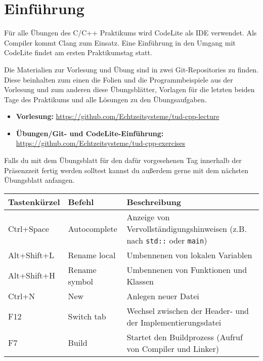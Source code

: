 \section*{Einführung}
Für alle Übungen des C/C++ Praktikums wird CodeLite als IDE verwendet. Als Compiler kommt Clang zum Einsatz.
Eine Einführung in den Umgang mit CodeLite findet am ersten Praktikumstag statt.

Die Materialien zur Vorlesung und Übung sind in zwei Git-Repositories zu finden.
Diese beinhalten zum einen die Folien und die Programmbeispiele aus der Vorlesung und zum anderen diese Übungsblätter, Vorlagen für die letzten beiden Tage des Praktikums und alle Lösungen zu den Übungsaufgaben.

\begin{itemize}
	\item \textbf{Vorlesung:} \url{https://github.com/Echtzeitsysteme/tud-cpp-lecture}
	\item \textbf{Übungen/Git- und CodeLite-Einführung:} \url{https://github.com/Echtzeitsysteme/tud-cpp-exercises}
\end{itemize}

Falls du mit dem Übungsblatt für den dafür vorgesehenen Tag innerhalb der Präsenzzeit fertig werden solltest kannst du außerdem gerne mit dem nächsten Übungsblatt anfangen.



\begin{tabular}{l|l|p{11.5cm}}
    \toprule
    \textbf{Tastenkürzel} & \textbf{Befehl} & \textbf{Beschreibung}\\
    \midrule
	Ctrl+Space & Autocomplete &
	Anzeige von Vervollständigungshinweisen (z.B. nach \texttt{std::} oder \texttt{main})
	\\
	Alt+Shift+L & Rename local &
	Umbennenen von lokalen Variablen
	\\
	Alt+Shift+H & Rename symbol &
	Umbennenen von Funktionen und Klassen
	\\
	Ctrl+N & New &
	Anlegen neuer Datei
	\\
	F12 & Switch tab &
	Wechsel zwischen der Header- und der Implementierungsdatei
	\\
	F7 & Build &
	Startet den Buildprozess (Aufruf von Compiler und Linker)
    \\\bottomrule
\end{tabular}
